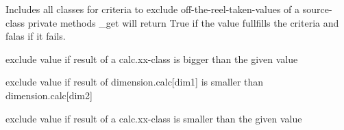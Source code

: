 \documentclass[letterpaper,10pt,english]{sphinxmanual}
\begin{document}

\begin{fulllineitems}
\label{methods:diaGrabber.methods.merge.sum}
\end{fulllineitems}

\label{methods:module-diaGrabber.methods.exclude}
Includes all classes for criteria to exclude
off-the-reel-taken-values of a source-class
private methods \_get will return True if the value fullfills the criteria and
falas if it fails.

\begin{fulllineitems}
\label{methods:diaGrabber.methods.exclude.calcBiggerValue}
exclude value if result of a calc.xx-class
is bigger than the given value

\end{fulllineitems}


\begin{fulllineitems}
\label{methods:diaGrabber.methods.exclude.calcSmallerCalc}
exclude value if result of dimension.calc{[}dim1{]}
is smaller than dimension.calc{[}dim2{]}

\end{fulllineitems}


\begin{fulllineitems}
\label{methods:diaGrabber.methods.exclude.calcSmallerValue}
exclude value if result of a calc.xx-class
is smaller than the given value

\end{fulllineitems}

\label{methods:module-diaGrabber.methods.transform}
\end{document}
